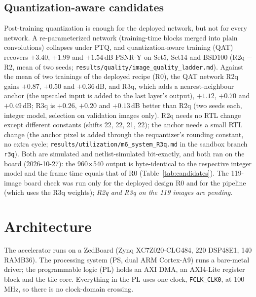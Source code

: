 \documentclass[conference]{IEEEtran}
\begin{document}
\subsection{Quantization-aware candidates}
Post-training quantization is enough for the deployed network, but not for every network. A re-parameterized network (training-time blocks merged into plain convolutions) collapses under PTQ, and quantization-aware training (QAT) recovers $+3.40$, $+1.99$ and $+1.54$\,dB PSNR-Y on Set5, Set14 and BSD100 (R2q $-$ R2, mean of two seeds; \texttt{results/\allowbreak{}quality/\allowbreak{}image\_quality\_ladder.md}).
Against the mean of two trainings of the deployed recipe (R0), the QAT network R2q gains $+0.87$, $+0.50$ and $+0.36$\,dB, and R3q, which adds a nearest-neighbour anchor (the upscaled input is added to the last layer's output), $+1.12$, $+0.70$ and $+0.49$\,dB; R3q is $+0.26$, $+0.20$ and $+0.13$\,dB better than R2q (two seeds each, integer model, selection on validation images only).
R2q needs no RTL change except different constants (shifts 22, 22, 21, 22); the anchor needs a small RTL change (the anchor pixel is added through the requantizer's rounding constant, no extra cycle; \texttt{results/\allowbreak{}utilization/\allowbreak{}m6\_system\_R3q.md} in the sandbox branch \texttt{r3q}).
Both are simulated and netlist-simulated bit-exactly, and both ran on the board (2026-10-27): the 960$\times$540 output is byte-identical to the respective integer model and the frame time equals that of R0 (Table~\ref{tab:candidates}). The 119-image board check was run only for the deployed design R0 and for the pipeline (which uses the R3q weights); \emph{R2q and R3q on the 119 images are pending}.

\section{Architecture}\label{sec:arch}
The accelerator runs on a ZedBoard (Zynq XC7Z020-CLG484, 220 DSP48E1, 140 RAMB36). The processing system (PS, dual ARM Cortex-A9) runs a bare-metal driver; the programmable logic (PL) holds an AXI DMA, an AXI4-Lite register block and the tile core.
Everything in the PL uses one clock, \texttt{FCLK\_CLK0}, at 100\,MHz, so there is no clock-domain crossing.
\end{document}
